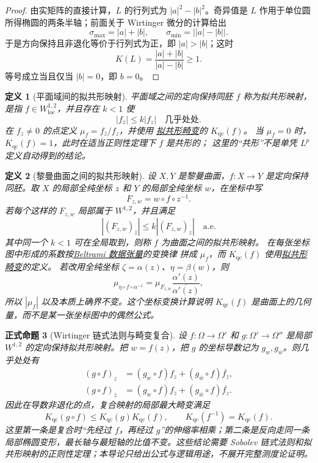 \documentclass[UTF8,fontset=none,a4paper,11pt]{ctexart}
\theoremstyle{foundation-definition}
\newtheorem{definition}{定义}[section]
\theoremstyle{foundation-theorem}
\theoremstyle{foundation-proposition}
\newtheorem{proposition}[definition]{正式命题}
\theoremstyle{foundation-example}
\theoremstyle{foundation-remark}
\theoremstyle{foundation-theorem}
\newcommand{\term}[2]{\hyperref[#1]{#2}}
\begin{document}
\begin{proof}
由实矩阵的直接计算，\(L\) 的行列式为 \(|a|^2-|b|^2\)。奇异值是 \(L\) 作用于单位圆所得椭圆的两条半轴；前面关于 Wirtinger 微分的计算给出
\[
\sigma_{\max}=|a|+|b|,\qquad
\sigma_{\min}=\bigl||a|-|b|\bigr|.
\]
于是方向保持且非退化等价于行列式为正，即 \(|a|>|b|\)；这时
\[
K(L)=\frac{|a|+|b|}{|a|-|b|}\geq1.
\]
等号成立当且仅当 \(|b|=0\)，即 \(b=0\)。
\end{proof}

\begin{definition}[平面域间的拟共形映射]\label{def:quasiconformal}
平面域之间的定向保持同胚 \(f\) 称为拟共形映射，是指
\(f\in W^{1,2}_{\mathrm{loc}}\)，并且存在 \(k<1\) 使
\[
|f_{\bar z}|\leq k|f_z|\quad\text{几乎处处}.
\]
在 \(f_z\neq0\) 的点定义 \(\mu_f=f_{\bar z}/f_z\)，并使用
\term{def:qc-distortion}{拟共形畸变}的 \(K_{\mathrm{qc}}(f)\)。
当 \(\mu_f=0\) 时，\(K_{\mathrm{qc}}(f)=1\)，此时在适当正则性定理下 \(f\) 是共形的；
这里的“共形”不是单凭 \(L^p\) 定义自动得到的结论。
\end{definition}

\begin{definition}[黎曼曲面之间的拟共形映射]\label{def:surface-quasiconformal}
设 \(X,Y\) 是黎曼曲面，\(f:X\to Y\) 是定向保持同胚。取 \(X\) 的局部全纯坐标
\(z\) 和 \(Y\) 的局部全纯坐标 \(w\)，在坐标中写
\[
F_{z,w}=w\circ f\circ z^{-1}.
\]
若每个这样的 \(F_{z,w}\) 局部属于 \(W^{1,2}\)，并且满足
\[
|(F_{z,w})_{\bar z}|\leq k|(F_{z,w})_z|
\quad\text{a.e.}
\]
其中同一个 \(k<1\) 可在全局取到，则称 \(f\) 为曲面之间的拟共形映射。
在每张坐标图中形成的系数按\term{def:beltrami-tensor}{Beltrami 数据张量}的变换律
拼成 \(\mu_f\)，而 \(K_{\mathrm{qc}}(f)\) 使用\term{def:qc-distortion}{拟共形畸变}的定义。
若改用全纯坐标 \(\zeta=\alpha(z)\)、\(\eta=\beta(w)\)，则
\[
\mu_{\eta\circ f\circ\alpha^{-1}}
=\mu_{F_{z,w}}\frac{\alpha'(z)}{\overline{\alpha'(z)}},
\]
所以 \(|\mu_f|\) 以及本质上确界不变。这个坐标变换计算说明
\(K_{\mathrm{qc}}(f)\) 是曲面上的几何量，而不是某一张坐标图中的偶然公式。
\end{definition}

\begin{proposition}[Wirtinger 链式法则与畸变复合]\label{prop:qc-composition}
设 \(f:\Omega\to\Omega'\) 和 \(g:\Omega'\to\Omega''\) 是局部 \(W^{1,2}\) 的定向保持拟共形映射。把 \(w=f(z)\)，把 \(g\) 的坐标导数记为 \(g_w,g_{\bar w}\)。则几乎处处有
\[
\begin{aligned}
  (g\circ f)_z
    &=(g_w\circ f)f_z+(g_{\bar w}\circ f)\overline{f_{\bar z}},\\
  (g\circ f)_{\bar z}
    &=(g_w\circ f)f_{\bar z}+(g_{\bar w}\circ f)\overline{f_z}.
\end{aligned}
\]
因此在导数非退化的点，复合映射的局部最大畸变满足
\[
  K_{\mathrm{qc}}(g\circ f)
  \leq K_{\mathrm{qc}}(g)K_{\mathrm{qc}}(f),
  \qquad
  K_{\mathrm{qc}}(f^{-1})=K_{\mathrm{qc}}(f).
\]
这里第一条是复合时“先经过 \(f\)，再经过 \(g\)”的伸缩率相乘；第二条是反向走同一条局部椭圆变形，最长轴与最短轴的比值不变。这些结论需要 Sobolev 链式法则和拟共形映射的正则性定理；本导论只给出公式与逻辑用途，不展开完整测度论证明。
\end{proposition}
\end{document}
